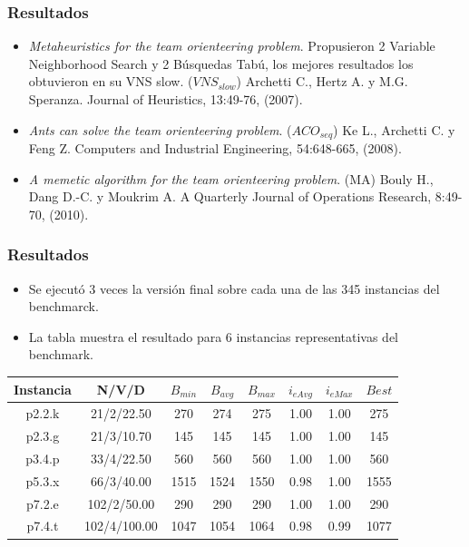 \documentclass{beamer}
\begin{document}

\begin{frame}
\frametitle{Resultados}

\begin{itemize}
	\item \textit{Metaheuristics for the team orienteering problem}. Propusieron 2 Variable Neighborhood Search y 2 Búsquedas Tabú, los mejores resultados los obtuvieron en su VNS slow. ($VNS_{slow}$) Archetti C., Hertz A. y M.G. Speranza. Journal of Heuristics, 13:49-76, (2007).
	\pause
	\item \textit{Ants can solve the team orienteering problem}. ($ACO_{seq}$) Ke L., Archetti C. y Feng Z. Computers and Industrial Engineering, 54:648-665, (2008).
	\pause
	\item \textit{A memetic algorithm for the team orienteering problem}. (MA) Bouly H., Dang D.-C. y Moukrim A. A Quarterly Journal of Operations Research, 8:49-70, (2010).
\end{itemize}

\end{frame}


\begin{frame}
\frametitle{Resultados}

\begin{itemize}
    \item Se ejecutó 3 veces la versión final sobre cada una de las 345 instancias del benchmarck.
    \pause
    \item La tabla muestra el resultado para 6 instancias representativas del benchmark.
\end{itemize}

\begin{table}
\begin{center}
\begin{tabular}{ |c|c|c|c|c|c|c|c| } 
\hline
Instancia & N/V/D & $B_{min}$ & $B_{avg}$ & $B_{max}$ & $i_{eAvg}$ & $i_{eMax}$ & $Best$ \\
\hline
p2.2.k & 21/2/22.50 & 270 & 274 & 275 & 1.00 & 1.00 & 275 \\
p2.3.g & 21/3/10.70 & 145 & 145 & 145 & 1.00 & 1.00 & 145 \\
p3.4.p & 33/4/22.50 & 560 & 560 & 560 & 1.00 & 1.00 & 560 \\
p5.3.x & 66/3/40.00 & 1515 & 1524 & 1550 & 0.98 & 1.00 & 1555 \\
p7.2.e & 102/2/50.00 & 290 & 290 & 290 & 1.00 & 1.00 & 290 \\
p7.4.t & 102/4/100.00 & 1047 & 1054 & 1064 & 0.98 & 0.99 & 1077 \\
\hline
\end{tabular}
\end{center}
\label{tab:resultados}
\end{table}

\end{frame}
\end{document}
